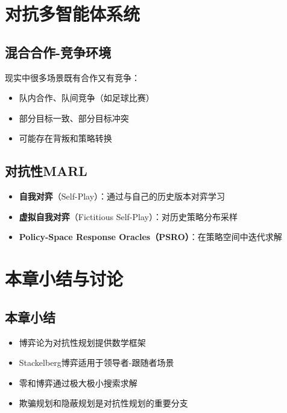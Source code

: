 \section{对抗多智能体系统}

\subsection{混合合作-竞争环境}

现实中很多场景既有合作又有竞争：
\begin{itemize}[leftmargin=2em]
  \item 队内合作、队间竞争（如足球比赛）
  \item 部分目标一致、部分目标冲突
  \item 可能存在背叛和策略转换
\end{itemize}

\subsection{对抗性MARL}

\begin{itemize}[leftmargin=2em]
  \item \textbf{自我对弈}（Self-Play）：通过与自己的历史版本对弈学习
  \item \textbf{虚拟自我对弈}（Fictitious Self-Play）：对历史策略分布采样
  \item \textbf{Policy-Space Response Oracles（PSRO）}：在策略空间中迭代求解
\end{itemize}

\section{本章小结与讨论}

\subsection*{本章小结}

\begin{itemize}[leftmargin=2em]
  \item 博弈论为对抗性规划提供数学框架
  \item Stackelberg博弈适用于领导者-跟随者场景
  \item 零和博弈通过极大极小搜索求解
  \item 欺骗规划和隐蔽规划是对抗性规划的重要分支
\end{itemize}

